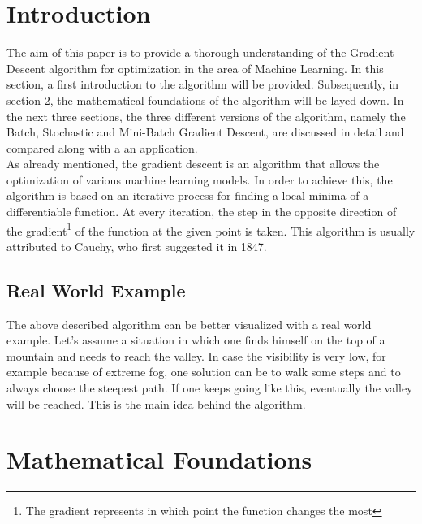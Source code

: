 \documentclass[conference]{IEEEtran}
\begin{document}
\section{Introduction}

The aim of this paper is to provide a thorough understanding of the Gradient Descent algorithm for optimization in the area of Machine Learning. In this section, a first introduction to the algorithm will be provided. Subsequently, in section 2, the mathematical foundations of the algorithm will be layed down. In the next three sections, the three different versions of the algorithm, namely the Batch, Stochastic and Mini-Batch Gradient Descent, are discussed in detail and compared along with a an application.
\\
As already mentioned, the gradient descent is an algorithm that allows the optimization of various machine learning models. In order to achieve this, the algorithm is based on an iterative process for finding a local minima of a differentiable function. At every iteration, the step in the opposite direction of the gradient\footnote{ The gradient represents in which point the function changes the most}  of the function at the given point is taken. 
This algorithm is usually attributed to Cauchy, who first suggested it in 1847.

\subsection{Real World Example}

The above described algorithm can be better visualized with a real world example.
Let's assume a situation in which one finds himself on the top of a mountain and needs to reach the valley. In case the visibility is very low, for example because of extreme fog, one solution can be to walk some steps and to always choose the steepest path. If one keeps going like this, eventually the valley will be reached. 
This is the main idea behind the algorithm. 




\section{Mathematical Foundations}
\end{document}
